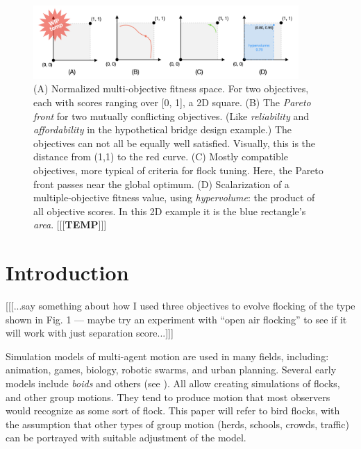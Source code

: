 \documentclass[letterpaper]{article}
\begin{document}


\begin{figure}[t]
    \centering
    \includegraphics[width=0.9\textwidth]{images/temp_MOF_HV.png}
    \caption{(A) Normalized multi-objective fitness space. For two objectives, each with scores ranging over [0, 1], a 2D square. (B) The \textit{Pareto front} for two mutually conflicting objectives. (Like \textit{reliability} and \textit{affordability} in the hypothetical bridge design example.) The objectives can not all be equally well satisfied. Visually, this is the distance from (1,1) to the red curve. (C) Mostly compatible objectives, more typical of criteria for flock tuning. Here, the Pareto front passes near the global optimum. (D) Scalarization of a multiple-objective fitness value, using \textit{hypervolume}: the product of all objective scores. In this 2D example it is the blue rectangle's \textit{area}. [[[\textbf{TEMP}]]]}
    \label{fig:MOF_HV}
\end{figure}


\section{Introduction}
\label{sec:intro}

[[[...say something about how I used three objectives to evolve flocking of the type shown in Fig. 1 --- maybe try an experiment with ``open air flocking'' to see if it will work with just separation score...]]]

Simulation models of multi-agent motion are used in many fields, including: animation, games, biology, robotic swarms, and urban planning. Several early models include \textit{boids} \citep{reynolds_flocks_1987} and others (see ). All allow creating simulations of flocks, and other group motions.  They tend to produce motion that most observers would recognize as some sort of flock. This paper will refer to bird flocks, with the assumption that other types of group motion (herds, schools, crowds, traffic) can be portrayed with suitable adjustment of the model.
\end{document}
